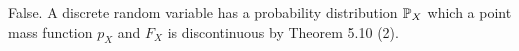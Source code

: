 
False. A discrete random variable has a probability distribution $ \P_{X} $ which a point mass
function $ p_{X} $ and $ F_{X} $ is discontinuous by Theorem 5.10 (2).
